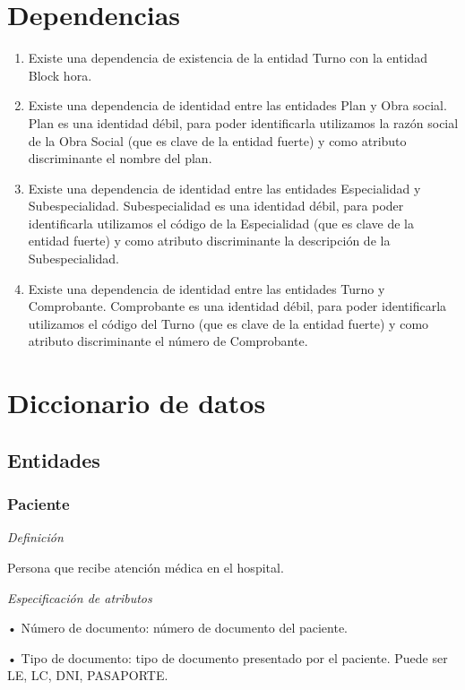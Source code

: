 \documentclass[a4paper,11pt]{article}
\begin{document}
\section{\textbf{Dependencias}}
\begin{enumerate}
\item Existe una dependencia de existencia de la entidad Turno con la entidad Block 
hora.

\item Existe una dependencia de identidad entre las entidades Plan y Obra social. 
Plan es una identidad débil, para poder identificarla utilizamos la razón social 
de la Obra Social (que es clave de la entidad fuerte) y como atributo discriminante 
el nombre del plan.

\item Existe una dependencia de identidad entre las entidades Especialidad y Subespecialidad. 
Subespecialidad es una identidad débil, para poder identificarla utilizamos el 
código de la Especialidad (que es clave de la entidad fuerte) y como atributo 
discriminante la descripción de la Subespecialidad.

\item Existe una dependencia de identidad entre las entidades Turno y Comprobante. 
Comprobante es una identidad débil, para poder identificarla utilizamos el código 
del Turno (que es clave de la entidad fuerte) y como atributo discriminante el 
número de Comprobante.\pagebreak{}
\end{enumerate}
\section{\textbf{Diccionario de datos}}

\subsection{\textbf{Entidades\label{HToc293405806}}}

\subsubsection{\textbf{Paciente}}

\textit{Definición}

Persona que recibe atención médica en el hospital. 

\textit{Especificación de atributos}

• Número de documento: número de documento del paciente.

• Tipo de documento: tipo de documento presentado por el paciente. Puede ser 
LE, LC, DNI, PASAPORTE.
\end{document}
